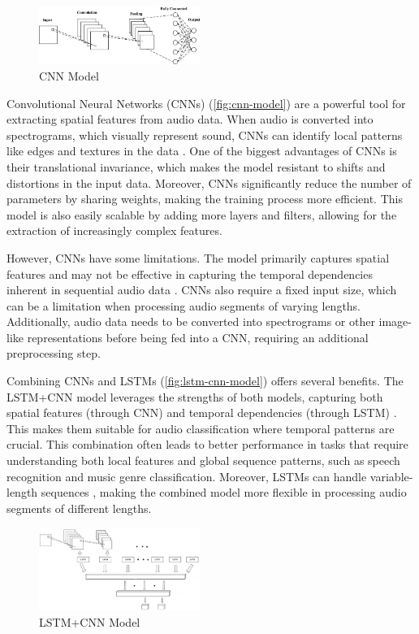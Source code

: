 \documentclass[twocolumn]{article}
\begin{document}
\begin{figure}[H]
  \centering
  \includegraphics[width=0.47\textwidth]{CNN-model.jpg}
  \caption{CNN Model}
  \label{fig:cnn-model}
\end{figure}

Convolutional Neural Networks (CNNs) (\autoref{fig:cnn-model}) are a powerful tool for extracting spatial
features from audio data. When audio is converted into spectrograms, which visually
represent sound, CNNs can identify local patterns like edges and textures in the data \cite{oshea2015introduction}.
One of the biggest advantages of CNNs is their translational invariance, which makes the
model resistant to shifts and distortions in the input data. Moreover, CNNs significantly
reduce the number of parameters by sharing weights, making the training process more
efficient. This model is also easily scalable by adding more layers and filters, allowing
for the extraction of increasingly complex features.

However, CNNs have some limitations. The model primarily captures spatial features and may
not be effective in capturing the temporal dependencies inherent in sequential
audio data \cite{lim2020time}. CNNs also require a fixed input size, which can be a limitation when
processing audio segments of varying lengths. Additionally, audio data needs to be
converted into spectrograms or other image-like representations before being fed into a CNN,
requiring an additional preprocessing step.

Combining CNNs and LSTMs (\autoref{fig:lstm-cnn-model}) offers several benefits. The LSTM+CNN model leverages
the strengths of both models, capturing both spatial features (through CNN) and
temporal dependencies (through LSTM) \cite{sainath2015convolutional}.
This makes them suitable for audio classification where temporal patterns are crucial.
This combination often leads to better performance in tasks that require understanding both
local features and global sequence patterns, such as speech recognition and music genre
classification. Moreover, LSTMs can handle variable-length sequences \cite{lim2020time},
making the combined model more flexible in processing audio segments of different lengths.

\begin{figure}[H]
  \centering
  \includegraphics[width=0.47\textwidth]{LSTM-CNN-model.png}
  \caption{LSTM+CNN Model}
  \label{fig:lstm-cnn-model}
\end{figure}
\end{document}
